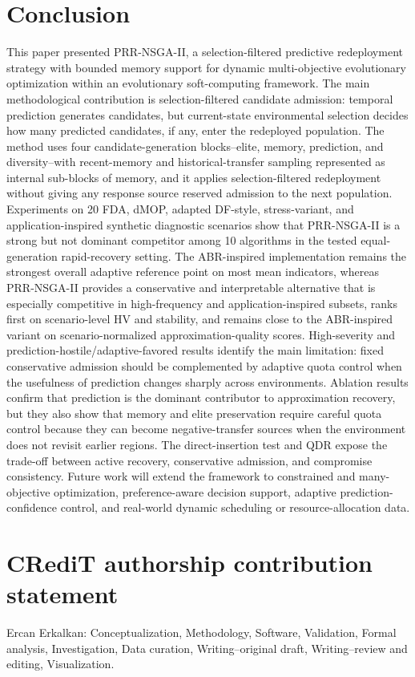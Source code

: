 \documentclass[1p,times]{elsarticle}
\begin{document}
\section{Conclusion}
This paper presented PRR-NSGA-II, a selection-filtered predictive redeployment strategy with bounded memory support for dynamic multi-objective evolutionary optimization within an evolutionary soft-computing framework. The main methodological contribution is selection-filtered candidate admission: temporal prediction generates candidates, but current-state environmental selection decides how many predicted candidates, if any, enter the redeployed population. The method uses four candidate-generation blocks--elite, memory, prediction, and diversity--with recent-memory and historical-transfer sampling represented as internal sub-blocks of memory, and it applies selection-filtered redeployment without giving any response source reserved admission to the next population. Experiments on 20 FDA, dMOP, adapted DF-style, stress-variant, and application-inspired synthetic diagnostic scenarios show that PRR-NSGA-II is a strong but not dominant competitor among 10 algorithms in the tested equal-generation rapid-recovery setting. The ABR-inspired implementation remains the strongest overall adaptive reference point on most mean indicators, whereas PRR-NSGA-II provides a conservative and interpretable alternative that is especially competitive in high-frequency and application-inspired subsets, ranks first on scenario-level HV and stability, and remains close to the ABR-inspired variant on scenario-normalized approximation-quality scores. High-severity and prediction-hostile/adaptive-favored results identify the main limitation: fixed conservative admission should be complemented by adaptive quota control when the usefulness of prediction changes sharply across environments. Ablation results confirm that prediction is the dominant contributor to approximation recovery, but they also show that memory and elite preservation require careful quota control because they can become negative-transfer sources when the environment does not revisit earlier regions. The direct-insertion test and QDR expose the trade-off between active recovery, conservative admission, and compromise consistency. Future work will extend the framework to constrained and many-objective optimization, preference-aware decision support, adaptive prediction-confidence control, and real-world dynamic scheduling or resource-allocation data.


\section*{CRediT authorship contribution statement}
Ercan Erkalkan: Conceptualization, Methodology, Software, Validation, Formal analysis, Investigation, Data curation, Writing--original draft, Writing--review and editing, Visualization.
\end{document}
